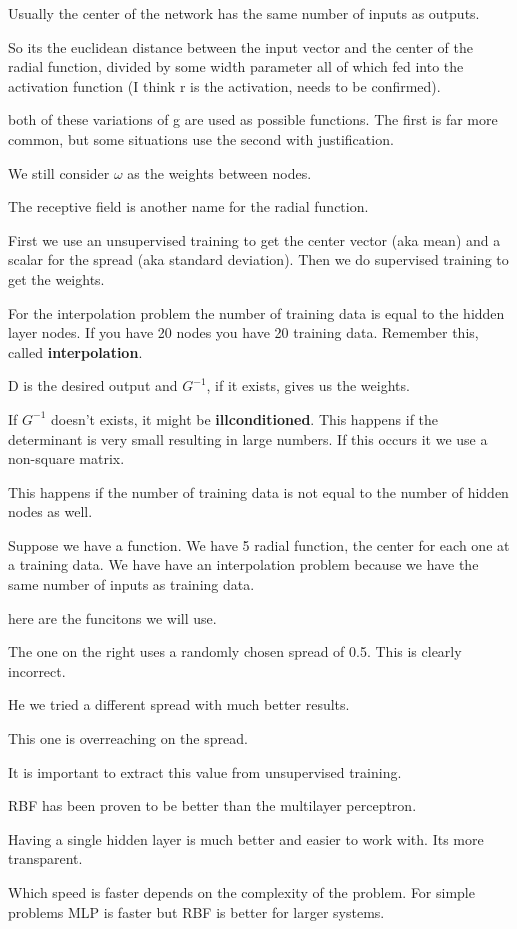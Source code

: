 \documentclass{article}
\begin{document}
Usually the center of the network has the same number of inputs as outputs.

So its the euclidean distance between the input vector and the center of the radial function, divided by some width parameter all of which fed into the activation function (I think r is the activation, needs to be confirmed).


both of these variations of g are used as possible functions. The first is far more common, but some situations use the second with justification.


We still consider $\omega$ as the weights between nodes.

The receptive field is another name for the radial function.


First we use an unsupervised training to get the center vector (aka mean) and a scalar for the spread (aka standard deviation). Then we do supervised training to get the weights.




For the interpolation problem the number of training data is equal to the hidden layer nodes. If you have 20 nodes you have 20 training data. Remember this, called \textbf{interpolation}.



D is the desired output and $G^{-1}$, if it exists, gives us the weights.

If $G^{-1}$ doesn't exists, it might be \textbf{illconditioned}. This happens if the determinant is very small resulting in large numbers. If this occurs it we use a non-square matrix.

This happens if the number of training data is not equal to the number of hidden nodes as well.


Suppose we have a function. We have 5 radial function, the center for each one at a training data. We have have an interpolation problem because we have the same number of inputs as training data.


here are the funcitons we will use.

The one on the right uses a randomly chosen spread of 0.5. This is clearly incorrect.


He we tried a different spread with much better results.


This one is overreaching on the spread.

It is important to extract this value from unsupervised training.




RBF has been proven to be better than the multilayer perceptron.

Having a single hidden layer is much better and easier to work with. Its more transparent.

Which speed is faster depends on the complexity of the problem. For simple problems MLP is faster but RBF is better for larger systems.




\end{document}
